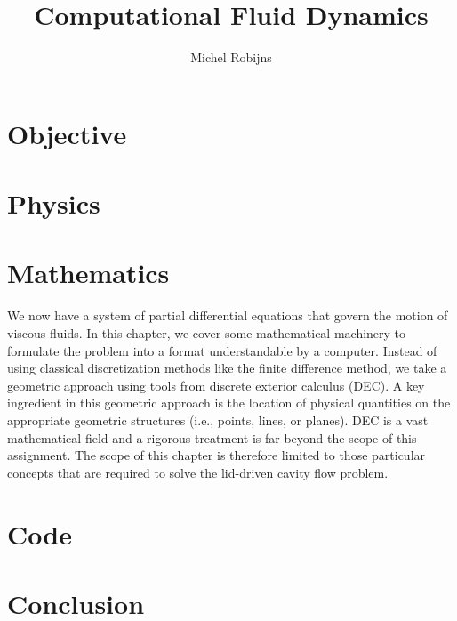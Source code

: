 \documentclass[a4paper,10pt]{scrreprt}
\begin{document}
\title{Computational Fluid Dynamics}
\author{Michel Robijns}

\maketitle

\tableofcontents

\chapter{Objective}



\chapter{Physics}
\label{cha:physics}



\chapter{Mathematics}
\label{cha:mathematics}

We now have a system of partial differential equations that govern the motion of viscous fluids. In this chapter, we cover some mathematical machinery to formulate the problem into a format understandable by a computer. Instead of using classical discretization methods like the finite difference method, we take a geometric approach using tools from discrete exterior calculus (DEC). A key ingredient in this geometric approach is the location of physical quantities on the appropriate geometric structures (i.e., points, lines, or planes). DEC is a vast mathematical field and a rigorous treatment is far beyond the scope of this assignment. The scope of this chapter is therefore limited to those particular concepts that are required to solve the lid-driven cavity flow problem.









\chapter{Code}

\chapter{Conclusion}
\end{document}
